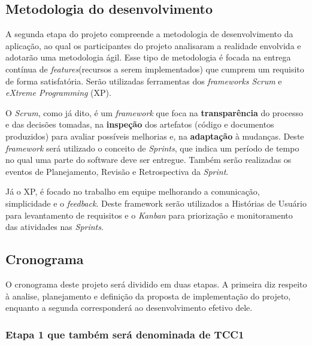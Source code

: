     \subsection{Metodologia do desenvolvimento}
        A segunda etapa do projeto compreende a metodologia de desenvolvimento da aplicação, ao qual os participantes do projeto analisaram a realidade envolvida e adotarão uma metodologia ágil. Esse tipo de metodologia é focada na entrega contínua de \textit{features}(recursos a serem implementados) que cumprem um requisito de forma satisfatória. Serão utilizadas ferramentas dos \textit{frameworks Scrum} e \textit{eXtreme Programming} (XP).
        
        O \textit{Scrum}, como já dito, é um \textit{framework} que foca na \textbf{transparência} do processo e das decisões tomadas, na \textbf{inspeção} dos artefatos (código e documentos produzidos) para avaliar possíveis melhorias e, na \textbf{adaptação} à mudanças. Deste \textit{framework} será utilizado o conceito de \textit{Sprints}, que indica um período de tempo no qual uma parte do software deve ser entregue. Também serão realizadas os eventos de Planejamento, Revisão e Retrospectiva da \textit{Sprint}.
        
        Já o XP, é focado no trabalho em equipe melhorando a comunicação, simplicidade e o \textit{feedback}. Deste framework serão utilizados a Histórias de Usuário para levantamento de requisitos e o \textit{Kanban} para priorização e monitoramento das atividades nas \textit{Sprints}.
        

    \subsection{Cronograma} \label{cronograma}
        O cronograma deste projeto será dividido em duas etapas. A primeira diz respeito à analise, planejamento e definição da proposta de implementação do projeto, enquanto a segunda corresponderá ao desenvolvimento efetivo dele.

        \subsubsection{Etapa 1 que também será denominada de TCC1}

